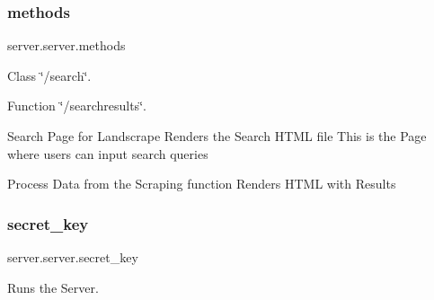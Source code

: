 \mbox{\label{namespaceserver_1_1server_a1e0984522028dec04483b66d00e8b6b6}} 
\subsubsection{\texorpdfstring{methods}{methods}}
{\footnotesize\ttfamily server.\+server.\+methods}



Class \char`\"{}/search\char`\"{}. 

Function \char`\"{}/searchresults\char`\"{}.

Search Page for Landscrape Renders the Search H\+T\+ML file This is the Page where users can input search queries

Process Data from the Scraping function Renders H\+T\+ML with Results \mbox{\label{namespaceserver_1_1server_a70d8440bb9056abff06b917ecacce061}} 
\subsubsection{\texorpdfstring{secret\+\_\+key}{secret\_key}}
{\footnotesize\ttfamily server.\+server.\+secret\+\_\+key}



Runs the Server. 

